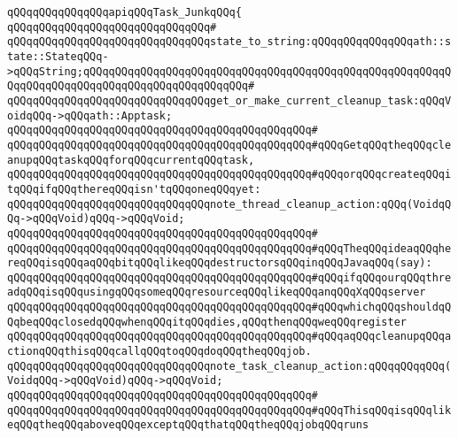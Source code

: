 \newline
\verb|qQQqqQQqqQQqqQQqapiqQQqTask_JunkqQQq{|\newline
\verb|qQQqqQQqqQQqqQQqqQQqqQQqqQQqqQQq#|\newline
\verb|qQQqqQQqqQQqqQQqqQQqqQQqqQQqqQQqstate_to_string:qQQqqQQqqQQqqQQqath::state::StateqQQq->qQQqString;qQQqqQQqqQQqqQQqqQQqqQQqqQQqqQQqqQQqqQQqqQQqqQQqqQQqqQQqqQQqqQQqqQQqqQQqqQQqqQQqqQQqqQQqqQQqqQQq#|\newline
\newline
\verb|qQQqqQQqqQQqqQQqqQQqqQQqqQQqqQQqget_or_make_current_cleanup_task:qQQqVoidqQQq->qQQqath::Apptask;|\newline
\verb|qQQqqQQqqQQqqQQqqQQqqQQqqQQqqQQqqQQqqQQqqQQqqQQq#|\newline
\verb|qQQqqQQqqQQqqQQqqQQqqQQqqQQqqQQqqQQqqQQqqQQqqQQq#qQQqGetqQQqtheqQQqcleanupqQQqtaskqQQqforqQQqcurrentqQQqtask,|\newline
\verb|qQQqqQQqqQQqqQQqqQQqqQQqqQQqqQQqqQQqqQQqqQQqqQQq#qQQqorqQQqcreateqQQqitqQQqifqQQqthereqQQqisn'tqQQqoneqQQqyet:|\newline
\newline
\verb|qQQqqQQqqQQqqQQqqQQqqQQqqQQqqQQqnote_thread_cleanup_action:qQQq(VoidqQQq->qQQqVoid)qQQq->qQQqVoid;|\newline
\verb|qQQqqQQqqQQqqQQqqQQqqQQqqQQqqQQqqQQqqQQqqQQqqQQq#|\newline
\verb|qQQqqQQqqQQqqQQqqQQqqQQqqQQqqQQqqQQqqQQqqQQqqQQq#qQQqTheqQQqideaqQQqhereqQQqisqQQqaqQQqbitqQQqlikeqQQqdestructorsqQQqinqQQqJavaqQQq(say):|\newline
\verb|qQQqqQQqqQQqqQQqqQQqqQQqqQQqqQQqqQQqqQQqqQQqqQQq#qQQqifqQQqourqQQqthreadqQQqisqQQqusingqQQqsomeqQQqresourceqQQqlikeqQQqanqQQqXqQQqserver|\newline
\verb|qQQqqQQqqQQqqQQqqQQqqQQqqQQqqQQqqQQqqQQqqQQqqQQq#qQQqwhichqQQqshouldqQQqbeqQQqclosedqQQqwhenqQQqitqQQqdies,qQQqthenqQQqweqQQqregister|\newline
\verb|qQQqqQQqqQQqqQQqqQQqqQQqqQQqqQQqqQQqqQQqqQQqqQQq#qQQqaqQQqcleanupqQQqactionqQQqthisqQQqcallqQQqtoqQQqdoqQQqtheqQQqjob.|\newline
\newline
\verb|qQQqqQQqqQQqqQQqqQQqqQQqqQQqqQQqnote_task_cleanup_action:qQQqqQQqqQQq(VoidqQQq->qQQqVoid)qQQq->qQQqVoid;|\newline
\verb|qQQqqQQqqQQqqQQqqQQqqQQqqQQqqQQqqQQqqQQqqQQqqQQq#|\newline
\verb|qQQqqQQqqQQqqQQqqQQqqQQqqQQqqQQqqQQqqQQqqQQqqQQq#qQQqThisqQQqisqQQqlikeqQQqtheqQQqaboveqQQqexceptqQQqthatqQQqtheqQQqjobqQQqruns|\newline

